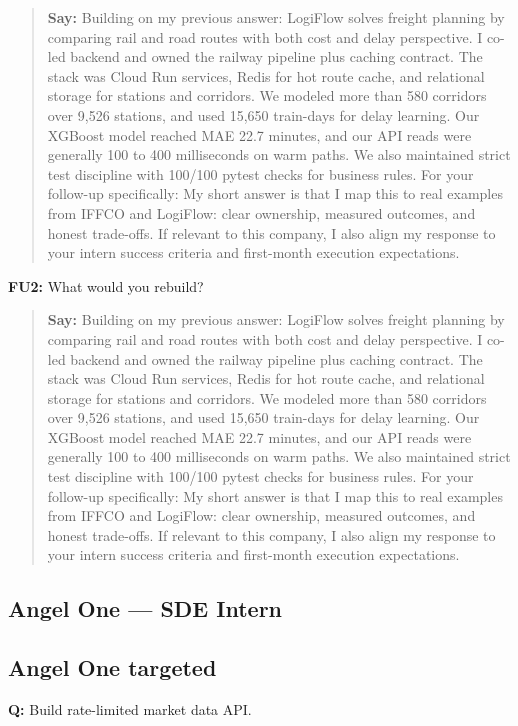 \documentclass[9pt,a4paper]{article}
\begin{document}
\begin{quote}\small\textbf{Say:} Building on my previous answer: LogiFlow solves freight planning by comparing rail and road routes with both cost and delay perspective. I co-led backend and owned the railway pipeline plus caching contract. The stack was Cloud Run services, Redis for hot route cache, and relational storage for stations and corridors. We modeled more than 580 corridors over 9,526 stations, and used 15,650 train-days for delay learning. Our XGBoost model reached MAE 22.7 minutes, and our API reads were generally 100 to 400 milliseconds on warm paths. We also maintained strict test discipline with 100/100 pytest checks for business rules. For your follow-up specifically: My short answer is that I map this to real examples from IFFCO and LogiFlow: clear ownership, measured outcomes, and honest trade-offs. If relevant to this company, I also align my response to your intern success criteria and first-month execution expectations.\end{quote}
\vspace{2mm}
\textbf{FU2:} What would you rebuild?

\begin{quote}\small\textbf{Say:} Building on my previous answer: LogiFlow solves freight planning by comparing rail and road routes with both cost and delay perspective. I co-led backend and owned the railway pipeline plus caching contract. The stack was Cloud Run services, Redis for hot route cache, and relational storage for stations and corridors. We modeled more than 580 corridors over 9,526 stations, and used 15,650 train-days for delay learning. Our XGBoost model reached MAE 22.7 minutes, and our API reads were generally 100 to 400 milliseconds on warm paths. We also maintained strict test discipline with 100/100 pytest checks for business rules. For your follow-up specifically: My short answer is that I map this to real examples from IFFCO and LogiFlow: clear ownership, measured outcomes, and honest trade-offs. If relevant to this company, I also align my response to your intern success criteria and first-month execution expectations.\end{quote}
\vspace{2mm}
\newpage
\subsection{Angel One --- SDE Intern}
\subsection{Angel One targeted}
\textbf{Q:} Build rate-limited market data API.
\end{document}
